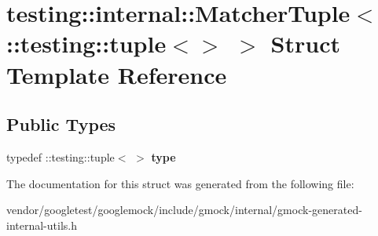 \hypertarget{structtesting_1_1internal_1_1MatcherTuple_3_01_1_1testing_1_1tuple_3_4_01_4}{}\section{testing\+:\+:internal\+:\+:Matcher\+Tuple$<$ \+:\+:testing\+:\+:tuple$<$$>$ $>$ Struct Template Reference}
\label{structtesting_1_1internal_1_1MatcherTuple_3_01_1_1testing_1_1tuple_3_4_01_4}
\subsection*{Public Types}
\begin{DoxyCompactItemize}
\item 
typedef \+::testing\+::tuple$<$  $>$ {\bfseries type}\hypertarget{structtesting_1_1internal_1_1MatcherTuple_3_01_1_1testing_1_1tuple_3_4_01_4_a8d4493b2b299322e6c885dee5473ebd7}{}\label{structtesting_1_1internal_1_1MatcherTuple_3_01_1_1testing_1_1tuple_3_4_01_4_a8d4493b2b299322e6c885dee5473ebd7}

\end{DoxyCompactItemize}


The documentation for this struct was generated from the following file\+:\begin{DoxyCompactItemize}
\item 
vendor/googletest/googlemock/include/gmock/internal/gmock-\/generated-\/internal-\/utils.\+h\end{DoxyCompactItemize}
